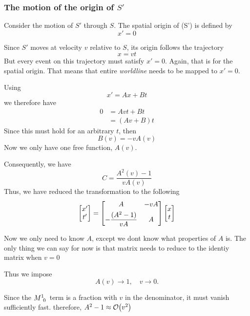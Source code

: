 	\subsubsection{The motion of the origin of $S'$}
		Consider the motion of $S'$ through $S$.
		The spatial origin of (S') is defined by
		\begin{equation}
			x'=0
		\end{equation}

		Since $S'$ moves at velocity $v$ relative to $S$, its origin follows the trajectory
		\begin{equation}
			x=vt
		\end{equation}
		But every event on this trajectory must satisfy $x'=0$.
		Again, that is for the spatial origin. That means that entire \textit{worldline} needs to be mapped to $x' = 0$.
		
		Using 
		\begin{equation}
		    x' = Ax+ Bt
		\end{equation}
		we therefore have
		\begin{align*}
			0 
			&= Avt + Bt\\
			&= (Av + B)t
		\end{align*}
		Since this must hold for an arbitrary $t$, then
		\begin{equation}
		    B(v) = -v A(v)
		\end{equation}
		Now we only have one free function, $A(v)$.

		Consequently, we have
		\begin{equation}
		    C = \frac{A^2(v)-1}{vA(v)} 
		\end{equation}
		Thus, we have reduced the transformation to the following
		\begin{equation}
			\bmqty{
				x'\\t'
			} =
			\bmqty{
				A & -vA \\[4pt]
				- \dfrac{(A^2-1)}{vA} & A
			}
			\bmqty{x\\t}
		\end{equation}

		Now we only need to know $A$, except we dont know what properties of $A$ is.
		The only thing we can say for now is that matrix needs to reduce to the identiy matrix when $v = 0$

		Thus we impose
		\[
			A(v)\to 1,\quad v\to 0. 
		\]

		Since the $\tensor{M}{^1_0}$ term is a fraction with $v$ in the denominator, it must vanish sufficiently fast.
		therefore, $A^2 - 1 \approx \order{v^2}$
